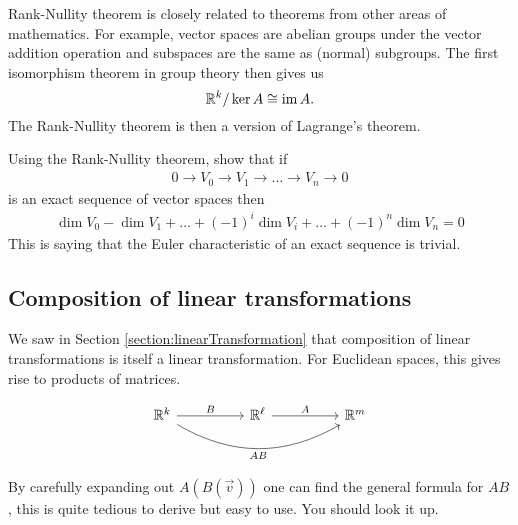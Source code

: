 \begin{remark}
  Rank-Nullity theorem is closely related to theorems from other areas of mathematics. For example, vector spaces are abelian groups under the vector addition operation and subspaces are the same as (normal) subgroups. The first isomorphism theorem in group theory then gives us $$\mathbb{R}^k / \ker A \cong \operatorname{im} A.$$
  The Rank-Nullity theorem is then a version of Lagrange's theorem.
  \begin{qbox}
    Using the Rank-Nullity theorem, show that if
    \begin{align*}
      0 \rightarrow V_0 \rightarrow V_1 \rightarrow \dots \rightarrow V_n \rightarrow 0
    \end{align*}
    is an exact sequence of vector spaces then
    \begin{align*}
      \dim V_0 - \dim V_1 + \dots + (-1)^i \dim V_i + \dots + (-1)^n \dim V_n = 0
    \end{align*}
    This is saying that the Euler characteristic of an exact sequence is trivial.
  \end{qbox}

\end{remark}


















\subsection{Composition of linear transformations}
We saw in Section \ref{section:linearTransformation} that composition of linear transformations is itself a linear transformation. For Euclidean spaces, this gives rise to products of matrices.

\begin{equation*}
  \begin{tikzcd}
    \bbr^k \ar[rr,"B"] \ar[rrrr,"AB"', bend right] && \bbr^\ell \ar[rr,"A"] && \bbr^m
  \end{tikzcd}
\end{equation*}

By carefully expanding out $A(B( \vec{v}))$ one can find the general formula for $AB$, this is quite tedious to derive but easy to use. You should look it up.

